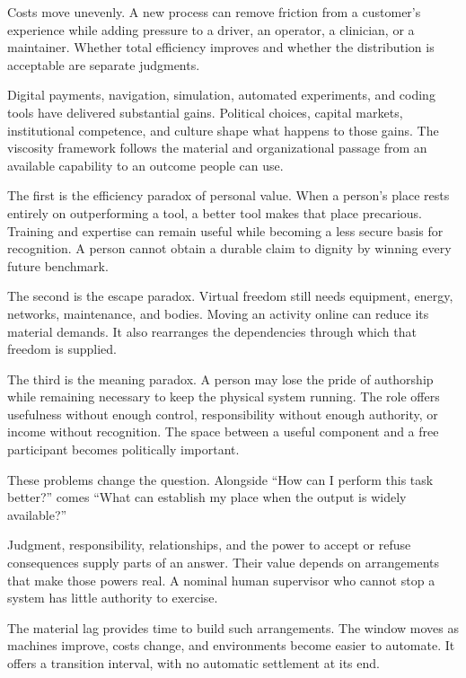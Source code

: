 
Costs move unevenly. A new process can remove friction from a customer's experience while adding pressure to a driver, an operator, a clinician, or a maintainer. Whether total efficiency improves and whether the distribution is acceptable are separate judgments.

Digital payments, navigation, simulation, automated experiments, and coding tools have delivered substantial gains. Political choices, capital markets, institutional competence, and culture shape what happens to those gains. The viscosity framework follows the material and organizational passage from an available capability to an outcome people can use.


The first is the efficiency paradox of personal value. When a person's place rests entirely on outperforming a tool, a better tool makes that place precarious. Training and expertise can remain useful while becoming a less secure basis for recognition. A person cannot obtain a durable claim to dignity by winning every future benchmark.

The second is the escape paradox. Virtual freedom still needs equipment, energy, networks, maintenance, and bodies. Moving an activity online can reduce its material demands. It also rearranges the dependencies through which that freedom is supplied.

The third is the meaning paradox. A person may lose the pride of authorship while remaining necessary to keep the physical system running. The role offers usefulness without enough control, responsibility without enough authority, or income without recognition. The space between a useful component and a free participant becomes politically important.


These problems change the question. Alongside “How can I perform this task better?” comes “What can establish my place when the output is widely available?”

Judgment, responsibility, relationships, and the power to accept or refuse consequences supply parts of an answer. Their value depends on arrangements that make those powers real. A nominal human supervisor who cannot stop a system has little authority to exercise.

The material lag provides time to build such arrangements. The window moves as machines improve, costs change, and environments become easier to automate. It offers a transition interval, with no automatic settlement at its end.

